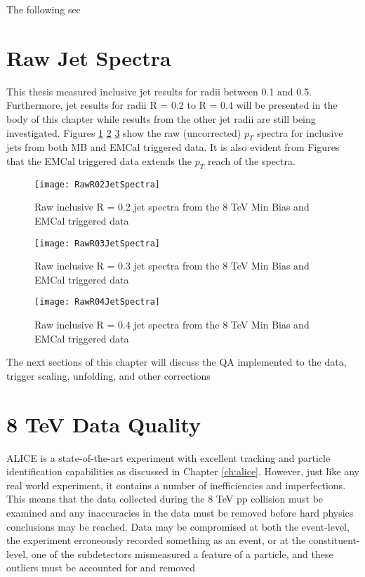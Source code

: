 \noindent

The following sec

\section{Raw Jet Spectra}

This thesis measured inclusive jet results for radii between 0.1 and 0.5.  Furthermore, jet results for radii R = 0.2 to R = 0.4 will be presented in the body of this chapter while results from the other jet radii are still being investigated.  Figures \ref{fig:rawjetR02} \ref{fig:rawjetR03} \ref{fig:rawjetR04} show the raw (uncorrected) $p_{T}$ spectra for inclusive jets from both MB and EMCal triggered data.  It is also evident from Figures that the EMCal triggered data extends the $p_{T}$ reach of the spectra.

\begin{figure}[h]
\texttt{[image: RawR02JetSpectra]}
\centering
\caption{Raw inclusive R = 0.2 jet spectra from the 8 TeV Min Bias and EMCal triggered data}
\label{fig:rawjetR02}
\end{figure}
\begin{figure}[h]
\texttt{[image: RawR03JetSpectra]}
\centering
\caption{Raw inclusive R = 0.3 jet spectra from the 8 TeV Min Bias and EMCal triggered data}
\label{fig:rawjetR03}
\end{figure}
\begin{figure}[h]
\texttt{[image: RawR04JetSpectra]}
\centering
\caption{Raw inclusive R = 0.4 jet spectra from the 8 TeV Min Bias and EMCal triggered data}
\label{fig:rawjetR04}
\end{figure}

\noindent
The next sections of this chapter will discuss the QA implemented to the data, trigger scaling, unfolding, and other corrections 

\section{8 TeV Data Quality}
ALICE is a state-of-the-art experiment with excellent tracking and particle identification capabilities as discussed in Chapter \ref{ch:alice}.  However, just like any real world experiment, it contains a number of inefficiencies and imperfections.  This means that the data collected during the 8 TeV pp collision must be examined and any inaccuracies in the data must be removed before hard physics conclusions may be reached.  Data may be compromised at both the event-level, the experiment erroneously recorded something as an event, or at the constituent-level, one of the subdetectors mismeasured a feature of a particle, and these outliers must be accounted for and removed 

